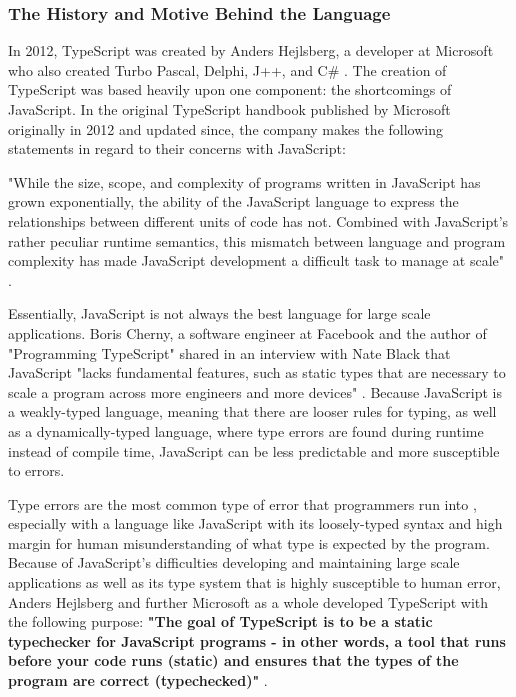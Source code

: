\documentclass{article}
\theoremstyle{theorem}
\theoremstyle{definition}
\theoremstyle{remark}
\begin{document}
\subsubsection{The History and Motive Behind the Language}

In 2012, TypeScript was created by Anders Hejlsberg, a developer at Microsoft who also created Turbo Pascal, Delphi, J++, and C\# \cite{10}. The creation of TypeScript was based heavily upon one component: the shortcomings of JavaScript. In the original TypeScript handbook published by Microsoft originally in 2012 and updated since, the company makes the following statements in regard to their concerns with JavaScript:

"While the size, scope, and complexity of programs written in JavaScript has grown exponentially, the ability of the JavaScript language to express the relationships between different units of code has not. Combined with JavaScript’s rather peculiar runtime semantics, this mismatch between language and program complexity has made JavaScript development a difficult task to manage at scale" \cite{11}.

Essentially, JavaScript is not always the best language for large scale applications. Boris Cherny, a software engineer at Facebook and the author of "Programming TypeScript" shared in an interview with Nate Black that JavaScript "lacks fundamental features, such as static types that are necessary to scale a program across more engineers and more devices" \cite{12}. Because JavaScript is a weakly-typed language, meaning that there are looser rules for typing, as well as a dynamically-typed language, where type errors are found during runtime instead of compile time, JavaScript can be less predictable and more susceptible to errors.

Type errors are the most common type of error that programmers run into \cite{11}, especially with a language like JavaScript with its loosely-typed syntax and high margin for human misunderstanding of what type is expected by the program. Because of JavaScript's difficulties developing and maintaining large scale applications as well as its type system that is highly susceptible to human error, Anders Hejlsberg and further Microsoft as a whole developed TypeScript with the following purpose: \textbf{"The goal of TypeScript is to be a static typechecker for JavaScript programs - in other words, a tool that runs before your code runs (static) and ensures that the types of the program are correct (typechecked)"} \cite{11}.
\end{document}
